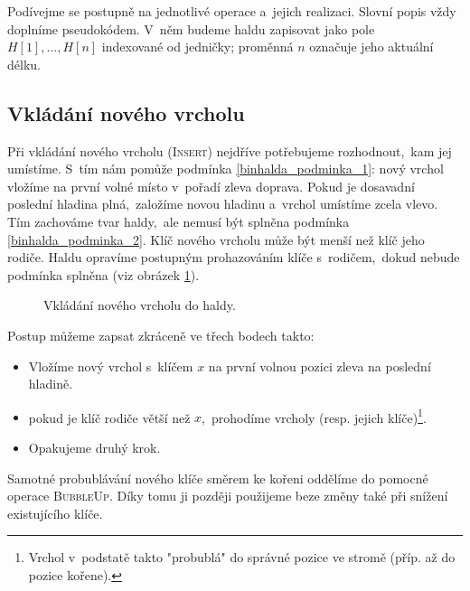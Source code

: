Podívejme se postupně na jednotlivé operace a~jejich realizaci. Slovní popis vždy doplníme pseudokódem. V~něm budeme haldu zapisovat jako pole $H[1],\dots,H[n]$ indexované od jedničky; proměnná $n$ označuje jeho aktuální délku.

\subsection{Vkládání nového vrcholu}

Při vkládání nového vrcholu (\textsc{Insert}) nejdříve potřebujeme rozhodnout,~kam jej umístíme. S~tím nám pomůže podmínka \ref{binhalda_podminka_1}: nový vrchol vložíme na první volné místo v~pořadí zleva doprava. Pokud je dosavadní poslední hladina plná,~založíme novou hladinu a~vrchol umístíme zcela vlevo. Tím zachováme tvar haldy,~ale nemusí být splněna podmínka \ref{binhalda_podminka_2}. Klíč nového vrcholu může být menší než klíč jeho rodiče. Haldu opravíme postupným prohazováním klíče s~rodičem,~dokud nebude podmínka splněna (viz obrázek \ref{fig:vkladani_vrcholu_halda}).
\begin{figure}[ht]
    \centering
    \begin{subfigure}{7cm}
        
    \end{subfigure}
    \begin{subfigure}{7cm}
        
    \end{subfigure}
    \caption{Vkládání nového vrcholu do haldy.}
    \label{fig:vkladani_vrcholu_halda}
\end{figure}
Postup můžeme zapsat zkráceně ve třech bodech takto:
\begin{itemize}
    \item Vložíme nový vrchol s~klíčem $x$ na první volnou pozici zleva na poslední hladině.
    \item pokud je klíč rodiče větší než $x$,~prohodíme vrcholy (resp. jejich klíče)\footnote{Vrchol v~podstatě takto "probublá" do správné pozice ve stromě (příp. až do pozice kořene).}.
    \item Opakujeme druhý krok.
\end{itemize}

Samotné probublávání nového klíče směrem ke kořeni oddělíme do pomocné operace \textsc{BubbleUp}. Díky tomu ji později použijeme beze změny také při snížení existujícího klíče.
\begin{algorithm}
    \caption{\textsc{bubble-up}}
    \label{alg:heap-bubble-up}
\end{algorithm}

